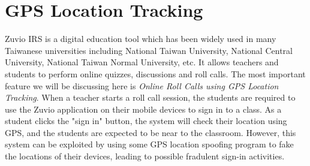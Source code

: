 \section{GPS Location Tracking}
Zuvio IRS is a digital education tool which has been widely used in many Taiwanese universities
including National Taiwan University, National Central University, National Taiwan Normal University, etc.
It allows teachers and students to perform online quizzes, discussions and roll calls. The most
important feature we will be discussing here is \emph{Online Roll Calls using GPS Location Tracking}.
When a teacher starts a roll call session, the students are required to use the Zuvio application
on their mobile devices to sign in to a class. As a student clicks the "sign in" button, the system will
check their location using GPS, and the students are expected to be near to the classroom. However, this
system can be exploited by using some GPS location spoofing program to fake the locations of their devices,
leading to possible fradulent sign-in activities.
